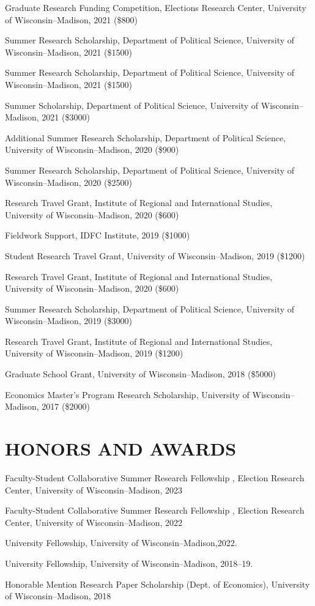 \documentclass[10pt,letterpaper]{article}
\renewenvironment{itemize}{
  \begin{list}{}{
      \setlength{\leftmargin}{1.5em}
      \setlength{\itemsep}{0.25em}
      \setlength{\parskip}{0pt}
      \setlength{\parsep}{0.25em}
    }
}{
  \end{list}
}
\begin{document}
\begin{itemize}
\item Graduate Research Funding Competition, Elections Research Center, University of Wisconsin--Madison, 2021  (\$800)
\item Summer Research Scholarship, Department of Political Science, University of Wisconsin--Madison, 2021  (\$1500)
\item Summer Research Scholarship, Department of Political Science, University of Wisconsin--Madison, 2021  (\$1500)
\item Summer Scholarship, Department of Political Science, University of Wisconsin--Madison, 2021  (\$3000)
\item Additional Summer Research Scholarship, Department of Political Science, University of Wisconsin--Madison, 2020  (\$900)
\item Summer Research Scholarship, Department of Political Science, University of Wisconsin--Madison, 2020  (\$2500)
\item Research Travel Grant, Institute of Regional and International Studies, University of Wisconsin--Madison, 2020  (\$600)
\item Fieldwork Support, IDFC Institute, 2019  (\$1000)
\item Student Research Travel Grant, University of Wisconsin--Madison, 2019  (\$1200)
\item Research Travel Grant, Institute of Regional and International Studies, University of Wisconsin--Madison, 2020  (\$600)
\item Summer Research Scholarship, Department of Political Science, University of Wisconsin--Madison, 2019 (\$3000)
\item Research Travel Grant, Institute of Regional and International Studies, University of Wisconsin--Madison, 2019  (\$1200)
\item Graduate School Grant, University of Wisconsin--Madison, 2018 (\$5000)
\item Economics Master's Program Research Scholarship, University of Wisconsin--Madison, 2017 (\$2000)
\end{itemize}


\section*{HONORS AND AWARDS}

\begin{itemize}
\item Faculty-Student Collaborative Summer Research Fellowship , Election Research Center, University of Wisconsin--Madison, 2023
\item Faculty-Student Collaborative Summer Research Fellowship , Election Research Center, University of Wisconsin--Madison, 2022
\item University Fellowship, University of Wisconsin--Madison,2022.
\item University Fellowship, University of Wisconsin--Madison, 2018--19.
\item Honorable Mention Research Paper Scholarship (Dept. of Economics), University of Wisconsin--Madison, 2018
\end{itemize}
\end{document}
